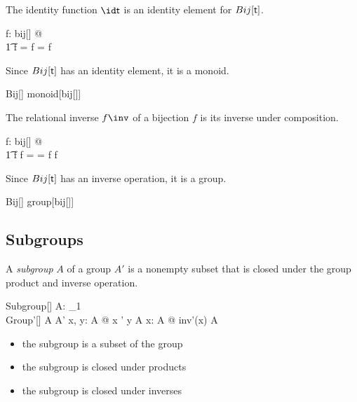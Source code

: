 \documentclass{amsart}
\begin{document}
\begin{remark}
The identity function $\id \genT$ is an identity element for $Bij[\mathsf{t}]$.

\begin{zed}
	\forall f: bij[\setT] @ \\
	\t1	 \id \setT \circ f = f = f \circ \id \setT
\end{zed}

Since $Bij[\mathsf{t}]$ has an identity element, it is a monoid.

\begin{zed}
	Bij[\setT] \in monoid[bij[\setT]]
\end{zed}

\end{remark}

\begin{remark}
The relational inverse $f \inv$ of a bijection $f$ is its inverse under composition.

\begin{zed}
	\forall f: bij[\setT] @ \\
	\t1	f \circ f \inv = \id \setT = f \inv \circ f
\end{zed}

Since $Bij[\mathsf{t}]$ has an inverse operation, it is a group.

\begin{zed}
	Bij[\setT] \in group[bij[\setT]]
\end{zed}

\end{remark}

\subsection{Subgroups}

A \textit{subgroup} $A$ of a group $A'$ is a nonempty subset that is closed under the group product and inverse operation.

\begin{schema}{Subgroup}[\genT]
	A: \power_1 \genT \\
	Group'[\genT]
\where
	A \subseteq A'
\also
	\forall x, y: A @ x \opG' y \in A
\also
	\forall x: A @ inv'(x) \in A
\end{schema}

\begin{itemize}
	\item the subgroup is a subset of the group
	\item the subgroup is closed under products
	\item the subgroup is closed under inverses
\end{itemize}
\end{document}
